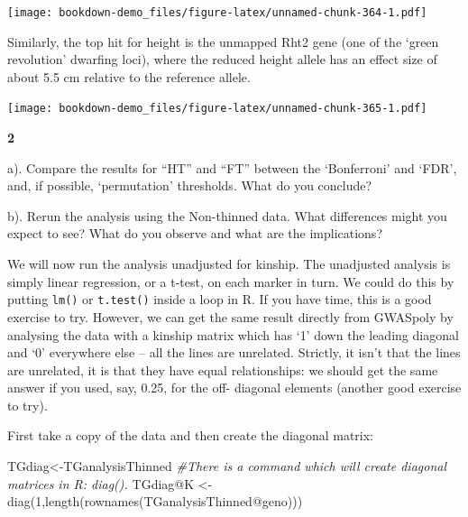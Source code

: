 \documentclass[
]{book}
\makeatletter
\newenvironment{Shaded}{\begin{snugshade}}{\end{snugshade}}
\newcommand{\AttributeTok}[1]{\textcolor[rgb]{0.77,0.63,0.00}{#1}}
\newcommand{\CommentTok}[1]{\textcolor[rgb]{0.56,0.35,0.01}{\textit{#1}}}
\newcommand{\DecValTok}[1]{\textcolor[rgb]{0.00,0.00,0.81}{#1}}
\newcommand{\FunctionTok}[1]{\textcolor[rgb]{0.00,0.00,0.00}{#1}}
\newcommand{\NormalTok}[1]{#1}
\newcommand{\OtherTok}[1]{\textcolor[rgb]{0.56,0.35,0.01}{#1}}
\newcommand{\SpecialCharTok}[1]{\textcolor[rgb]{0.00,0.00,0.00}{#1}}
\newenvironment{kframe}{%
\medskip{}
\setlength{\fboxsep}{.8em}
 \def\at@end@of@kframe{}%
 \ifinner\ifhmode%
  \def\at@end@of@kframe{\end{minipage}}%
  \begin{minipage}{\columnwidth}%
 \fi\fi%
 \def\FrameCommand##1{\hskip\@totalleftmargin \hskip-\fboxsep
 \colorbox{shadecolor}{##1}\hskip-\fboxsep
     \hskip-\linewidth \hskip-\@totalleftmargin \hskip\columnwidth}%
 \MakeFramed {\advance\hsize-\width
   \@totalleftmargin\z@ \linewidth\hsize
   \@setminipage}}%
 {\par\unskip\endMakeFramed%
 \at@end@of@kframe}
\newenvironment{rmdblock}[1]
  {
  \begin{itemize}
  \renewcommand{\labelitemi}{
    \raisebox{-.7\height}[0pt][0pt]{
      {\setkeys{Gin}{width=3em,keepaspectratio}\texttt{[image: images/\#1]}}
    }
  }
  \setlength{\fboxsep}{1em}
  \begin{kframe}
  \item
  }
  {
  \end{kframe}
  \end{itemize}
  }
\newenvironment{rmdquiz}
  {\begin{rmdblock}{quiz}}
  {\end{rmdblock}}
\makeatother
\begin{document}
\texttt{[image: bookdown-demo\_files/figure-latex/unnamed-chunk-364-1.pdf]}

Similarly, the top hit for height is the unmapped Rht2 gene (one of the `green revolution' dwarfing loci), where the reduced height allele has an effect size of about 5.5 cm relative to the reference allele.

\begin{Shaded}
\end{Shaded}

\texttt{[image: bookdown-demo\_files/figure-latex/unnamed-chunk-365-1.pdf]}

\begin{rmdquiz}
\textbf{2}

a). Compare the results for ``HT'' and ``FT'' between the `Bonferroni' and `FDR', and, if possible, `permutation' thresholds. What do you conclude?

b). Rerun the analysis using the Non-thinned data. What differences might you expect to see? What do you observe and what are the implications?
\end{rmdquiz}

We will now run the analysis unadjusted for kinship. The unadjusted analysis is simply linear regression, or a t-test, on each marker in turn. We could do this by putting \texttt{lm()} or \texttt{t.test()} inside a loop in R. If you have time, this is a good exercise to try. However, we can get the same result directly from GWASpoly by analysing the data with a kinship matrix which has `1' down the leading diagonal and `0' everywhere else -- all the lines are unrelated. Strictly, it isn't that the lines are unrelated, it is that they have equal relationships: we should get the same answer if you used, say, 0.25, for the off- diagonal elements (another good exercise to try).

First take a copy of the data and then create the diagonal matrix:

\begin{Shaded}
\begin{Highlighting}[]
\NormalTok{TGdiag}\OtherTok{\textless{}{-}}\NormalTok{TGanalysisThinned}
\CommentTok{\#There is a command which will create diagonal matrices in R: diag().  }
\NormalTok{TGdiag}\SpecialCharTok{@}\NormalTok{K }\OtherTok{\textless{}{-}} \FunctionTok{diag}\NormalTok{(}\DecValTok{1}\NormalTok{,}\FunctionTok{length}\NormalTok{(}\FunctionTok{rownames}\NormalTok{(TGanalysisThinned}\SpecialCharTok{@}\NormalTok{geno)))}
\end{Highlighting}
\end{Shaded}
\end{document}
